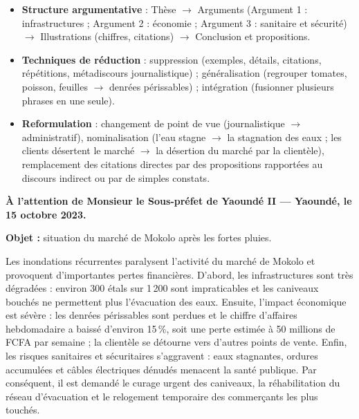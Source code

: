 \documentclass[11pt]{article}
\newcommand{\cle}[1]{{\popxbold\color{popdark}#1}}
\newcounter{popsec}
\newcounter{popsub}
\newcommand{\courssub}[1]{%
  \stepcounter{popsub}%
  \par\vspace{9pt}\noindent{\popxbold\fontsize{11.5}{13}\selectfont\color{popink}{\color{poporange}\thepopsec.\thepopsub}\hspace{6pt}#1}\par\nopagebreak\vspace{4pt}
}
\begin{document}
\courssub{Ressources à mobiliser}
\begin{itemize}
    \item \textbf{Structure argumentative} : Thèse $\rightarrow$ Arguments (Argument 1 : infrastructures ; Argument 2 : économie ; Argument 3 : sanitaire et sécurité) $\rightarrow$ Illustrations (chiffres, citations) $\rightarrow$ Conclusion et propositions.
    \item \textbf{Techniques de réduction} : \cle{suppression} (exemples, détails, citations, répétitions, métadiscours journalistique) ; \cle{généralisation} (regrouper \og{}tomates, poisson, feuilles\fg{} $\rightarrow$ \og{}denrées périssables\fg{}) ; \cle{intégration} (fusionner plusieurs phrases en une seule).
    \item \textbf{Reformulation} : changement de point de vue (journalistique $\rightarrow$ administratif), nominalisation (\og{}l'eau stagne\fg{} $\rightarrow$ \og{}la stagnation des eaux\fg{} ; \og{}les clients désertent le marché\fg{} $\rightarrow$ \og{}la désertion du marché par la clientèle\fg{}), remplacement des citations directes par des propositions rapportées au discours indirect ou par de simples constats.
\end{itemize}

\begin{exemplebox}
\textbf{À l'attention de Monsieur le Sous-préfet de Yaoundé II --- Yaoundé, le 15 octobre 2023.}

\textbf{Objet :} situation du marché de Mokolo après les fortes pluies.

Les inondations récurrentes paralysent l'activité du marché de Mokolo et provoquent d'importantes pertes financières. D'abord, les infrastructures sont très dégradées : environ 300 étals sur 1\,200 sont impraticables et les caniveaux bouchés ne permettent plus l'évacuation des eaux. Ensuite, l'impact économique est sévère : les denrées périssables sont perdues et le chiffre d'affaires hebdomadaire a baissé d'environ 15\,\%, soit une perte estimée à 50 millions de FCFA par semaine ; la clientèle se détourne vers d'autres points de vente. Enfin, les risques sanitaires et sécuritaires s'aggravent : eaux stagnantes, ordures accumulées et câbles électriques dénudés menacent la santé publique. Par conséquent, il est demandé le curage urgent des caniveaux, la réhabilitation du réseau d'évacuation et le relogement temporaire des commerçants les plus touchés.
\end{exemplebox}
\end{document}
